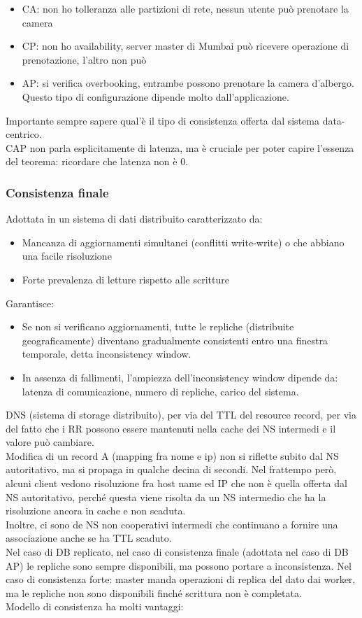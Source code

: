 \documentclass{article}
\begin{document}
\begin{itemize}
\item CA: non ho tolleranza alle partizioni di rete, nessun utente può prenotare la camera
\item CP: non ho availability, server master di Mumbai può ricevere operazione di prenotazione, l'altro non può
\item AP: si verifica overbooking, entrambe possono prenotare la camera d'albergo. Questo tipo di configurazione dipende molto dall'applicazione.
\end{itemize}
Importante sempre sapere qual'è il tipo di consistenza offerta dal sistema data-centrico.\\ CAP non parla esplicitamente di latenza, ma è  cruciale per poter capire l'essenza del teorema: ricordare che latenza non è 0.
\subsubsection{Consistenza finale}
Adottata in un sistema di dati distribuito caratterizzato da:
\begin{itemize}
\item Mancanza di aggiornamenti simultanei (conflitti write-write) o che abbiano una facile risoluzione
\item Forte prevalenza di letture rispetto alle scritture
\end{itemize}
Garantisce:
\begin{itemize}
\item Se non si verificano aggiornamenti, tutte le repliche (distribuite geograficamente) diventano gradualmente consistenti entro una finestra temporale, detta inconsistency window.
\item In assenza di fallimenti, l'ampiezza dell'inconsistency window dipende da: latenza di comunicazione, numero di repliche, carico del sistema.
\end{itemize}
DNS (sistema di storage distribuito), per via del TTL del resource record, per via del fatto che i RR possono essere mantenuti nella cache dei NS intermedi e il valore può cambiare.\\ Modifica di un record A (mapping fra nome e ip) non si riflette subito dal NS autoritativo, ma si propaga in qualche decina di secondi. Nel frattempo però, alcuni client vedono risoluzione fra host name ed IP che non è quella offerta dal NS autoritativo, perché questa viene risolta da un NS intermedio che ha la risoluzione ancora in cache e non scaduta.\\ Inoltre, ci sono de NS non cooperativi intermedi che continuano a fornire una associazione anche se ha TTL scaduto.\\ Nel caso di DB replicato, nel caso di consistenza finale (adottata nel caso di DB AP) le repliche sono sempre disponibili, ma possono portare a inconsistenza. Nel caso di consistenza forte: master manda operazioni di replica del dato dai worker, ma le repliche non sono disponibili finché scrittura non è completata.\\ Modello di consistenza ha molti vantaggi:
\end{document}
